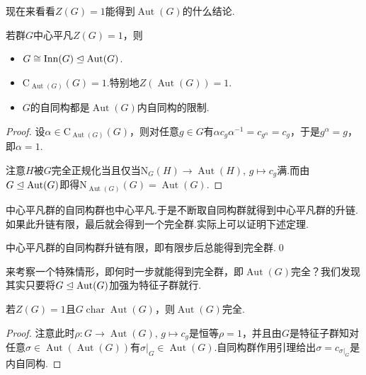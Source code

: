 现在来看看$Z(G)=1$能得到$\operatorname*{Aut}(G)$的什么结论.
\begin{prop}
	若群$G$中心平凡$Z(G)=1$，则
	\begin{itemize}
		\item $G\cong\operatorname*{Inn}(G)\trianglelefteq\operatorname*{Aut}(G)$.
		\item $\mathrm{C}_{\operatorname*{Aut}(G)}(G)=1$.特别地$Z(\operatorname*{Aut}(G))=1$.
		\item $G$的自同构都是$\operatorname*{Aut}(G)$内自同构的限制.\footnotemark
	\end{itemize}
\end{prop}
\begin{proof}
	设$\alpha\in\mathrm{C}_{\operatorname*{Aut}(G)}(G)$，则对任意$g\in G$有$\alpha c_g\alpha^{-1}=c_{g^\alpha}=c_g$，于是$g^\alpha=g$，即$\alpha=1$.

	注意$H$被$G$完全正规化当且仅当$\mathrm{N}_G(H)\to\operatorname*{Aut}(H),\,g\mapsto c_g$满.而由$G\trianglelefteq\operatorname*{Aut}(G)$即得$\mathrm{N}_{\operatorname*{Aut}(G)}(G)=\operatorname*{Aut}(G)$.
\end{proof}

中心平凡群的自同构群也中心平凡.于是不断取自同构群就得到中心平凡群的升链.如果此升链有限，最后就会得到一个完全群.实际上可以证明下述定理.
\begin{thm}[(Wielandt)]
	中心平凡群的自同构群升链有限，即有限步后总能得到完全群.\qed
\end{thm}

来考察一个特殊情形，即何时一步就能得到完全群，即$\operatorname*{Aut}(G)$完全？我们发现其实只要将$G\trianglelefteq\operatorname*{Aut}(G)$加强为特征子群就行.
\begin{prop}
	若$Z(G)=1$且$G\operatorname*{char}\operatorname*{Aut}(G)$，则$\operatorname*{Aut}(G)$完全.
\end{prop}
\begin{proof}
	注意此时$\rho\colon G\to\operatorname*{Aut}(G),\,g\mapsto c_g$是恒等$\rho=1$，并且由$G$是特征子群知对任意$\sigma\in\operatorname*{Aut}(\operatorname*{Aut}(G))$有$\sigma|_G\in\operatorname*{Aut}(G)$.自同构群作用引理给出$\sigma=c_{\sigma|_G}$是内自同构.
\end{proof}

